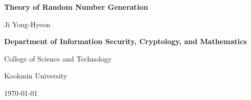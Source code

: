 \documentclass[12pt,openany]{book}
\theoremstyle{definition}
\begin{document}
	
	\begin{titlepage}
		\begin{center}
			{\Huge\textsf{\textbf{Theory of Random Number Generation}}\par}
			\vspace{0.5in}
			{\Large Ji Yong-Hyeon\par}
			\vspace{1in}
			\vspace{1in}
			{\bf Department of Information Security, Cryptology, and Mathematics\par}
			{College of Science and Technology\par}
			{Kookmin University\par}
			\vspace{.25in}
			{\large \today\par}
		\end{center}
	\end{titlepage}
	
	\tableofcontents
	
	\mainmatter
	
\end{document}
